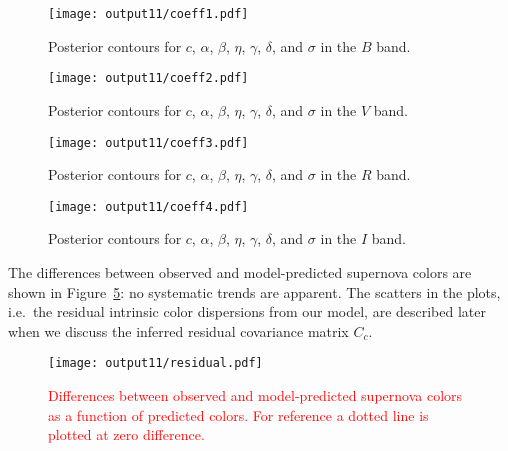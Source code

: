 \documentclass{aastex61}   	%
\begin{document}
\begin{figure}[htbp] %
   \centering
   \texttt{[image: output11/coeff1.pdf]} 
            \caption{Posterior contours for $c$, $\alpha$, $\beta$, $\eta$, $\gamma$, $\delta$, and $\sigma$ in the $B$ band.
 \label{global2:fig}}
\end{figure}

\begin{figure}[htbp] %
   \centering
   \texttt{[image: output11/coeff2.pdf]} 
            \caption{Posterior contours for $c$, $\alpha$, $\beta$, $\eta$, $\gamma$, $\delta$, and $\sigma$ in the $V$ band.
 \label{global3:fig}}
\end{figure}

\begin{figure}[htbp] %
   \centering
      \texttt{[image: output11/coeff3.pdf]} 
            \caption{Posterior contours for $c$, $\alpha$, $\beta$, $\eta$, $\gamma$, $\delta$, and $\sigma$ in the $R$ band.
 \label{global4:fig}}
\end{figure}

\begin{figure}[htbp] %
   \centering
         \texttt{[image: output11/coeff4.pdf]} 
            \caption{Posterior contours for $c$, $\alpha$, $\beta$, $\eta$, $\gamma$, $\delta$, and $\sigma$ in the $I$ band.
 \label{global5:fig}}
\end{figure}

\color{red}

The differences between observed and model-predicted supernova colors are shown in Figure~\ref{residual:fig}:
no systematic trends are apparent.
The scatters in the plots, i.e.\ the residual intrinsic color dispersions from our model, are described
later when we discuss the inferred residual covariance matrix $C_c$.
\begin{figure}[htbp] %
   \centering
   \texttt{[image: output11/residual.pdf]} 
            \caption{\textcolor{red}{Differences between observed and  model-predicted supernova colors  as a function
            of predicted colors.  For reference a dotted line is plotted at zero difference.}
            \label{residual:fig}}
\end{figure}

\color{black}
\end{document}
